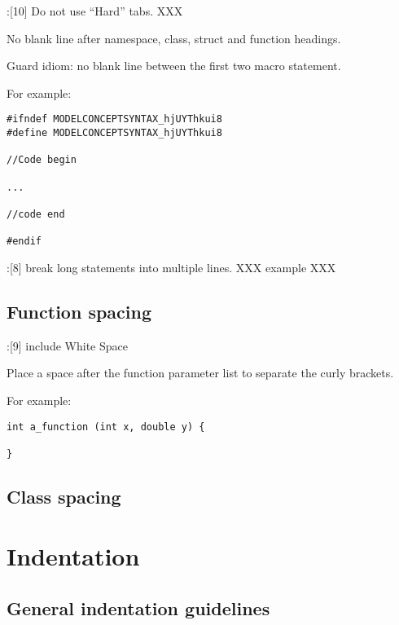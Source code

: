 \documentclass{book}
\begin{document}
\cite{OKL_MisfeldtBumgardnerGray2004CppStyle}:[10] Do not use ``Hard'' tabs. XXX

No blank line after namespace, class, struct and function headings.

Guard idiom: no blank line between the first two macro statement. 

For example:

\begin{verbatim}
#ifndef MODELCONCEPTSYNTAX_hjUYThkui8
#define MODELCONCEPTSYNTAX_hjUYThkui8

//Code begin

...

//code end

#endif
\end{verbatim}

\cite{OKL_MisfeldtBumgardnerGray2004CppStyle}:[8] break long statements into multiple lines. XXX example XXX

\subsection{Function spacing}
\label{subsec:FuncSpacing}

\cite{OKL_MisfeldtBumgardnerGray2004CppStyle}:[9] include White Space

Place a space after the function parameter list to separate the curly brackets.

For example:

\begin{verbatim}
int a_function (int x, double y) {

}                                          
\end{verbatim}



\subsection{Class spacing}
\label{subsec:ClassSpacing}




\section{Indentation}
\label{sec:Indentation}

\subsection{General indentation guidelines}
\label{subsec:GenIndentation}
\end{document}
